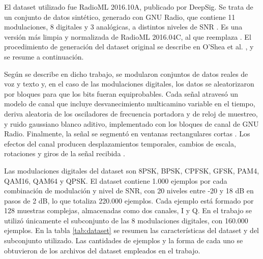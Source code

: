 El dataset utilizado fue RadioML 2016.10A, publicado por DeepSig. Se trata de un conjunto de datos sintético, generado con GNU Radio, que contiene 11 modulaciones, 8 digitales y 3 analógicas, a distintos niveles de SNR \cite{deepsig2016datasets}. Es una versión más limpia y normalizada de RadioML 2016.04C, al que reemplaza \cite{deepsig2016datasets}. El procedimiento de generación del dataset original se describe en O'Shea et al. \cite{oshea2016convolutional}, y se resume a continuación.

Según se describe en dicho trabajo, se modularon conjuntos de datos reales de voz y texto y, en el caso de las modulaciones digitales, los datos se aleatorizaron por bloques para que los bits fueran equiprobables. Cada señal atravesó un modelo de canal que incluye desvanecimiento multicamino variable en el tiempo, deriva aleatoria de los osciladores de frecuencia portadora y de reloj de muestreo, y ruido gaussiano blanco aditivo, implementado con los bloques de canal de GNU Radio. Finalmente, la señal se segmentó en ventanas rectangulares cortas \cite{oshea2016convolutional}. Los efectos del canal producen desplazamientos temporales, cambios de escala, rotaciones y giros de la señal recibida \cite{oshea2016convolutional}.

Las modulaciones digitales del dataset son 8PSK, BPSK, CPFSK, GFSK, PAM4, QAM16, QAM64 y QPSK. El dataset contiene 1.000 ejemplos por cada combinación de modulación y nivel de SNR, con 20 niveles entre -20 y 18 dB en pasos de 2 dB, lo que totaliza 220.000 ejemplos. Cada ejemplo está formado por 128 muestras complejas, almacenadas como dos canales, I y Q. En el trabajo se utilizó únicamente el subconjunto de las 8 modulaciones digitales, con 160.000 ejemplos. En la tabla \ref{tab:dataset} se resumen las características del dataset y del subconjunto utilizado. Las cantidades de ejemplos y la forma de cada uno se obtuvieron de los archivos del dataset empleados en el trabajo.

